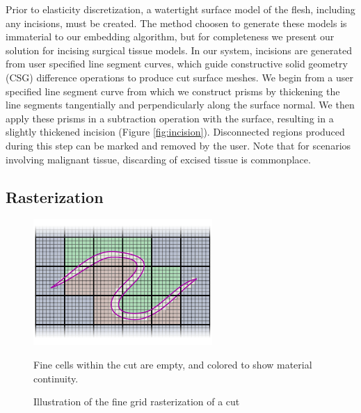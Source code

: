 Prior to elasticity discretization, a watertight surface model of the
flesh, including any incisions, must be created. The method choosen to
generate these models is immaterial to our embedding algorithm, but
for completeness we present our solution for incising surgical tissue
models. In our system, incisions are generated from user specified
line segment curves, which guide constructive solid geometry (CSG)
difference operations to produce cut surface meshes.  We begin from a
user specified line segment curve from which we construct prisms by
thickening the line segments tangentially and perpendicularly along
the surface normal. We then apply these prisms in a subtraction
operation with the surface, resulting in a slightly thickened incision
(Figure \ref{fig:incision}). Disconnected regions produced during this
step can be marked and removed by the user. Note that for scenarios
involving malignant tissue, discarding of excised tissue is
commonplace.

\subsection{Rasterization}

\begin{figure}
  \centering
  \vspace*{-.25in}
  \includegraphics[width=\columnwidth]{chapter_gridiron/images/Figure_Topology_C}
\vspace*{-.3in}
  \caption{Illustration of the fine grid rasterization of a cut}{Fine cells within the cut are empty, and colored to show material continuity.}
\label{Fig:CuttingFineGrid}
\end{figure}


